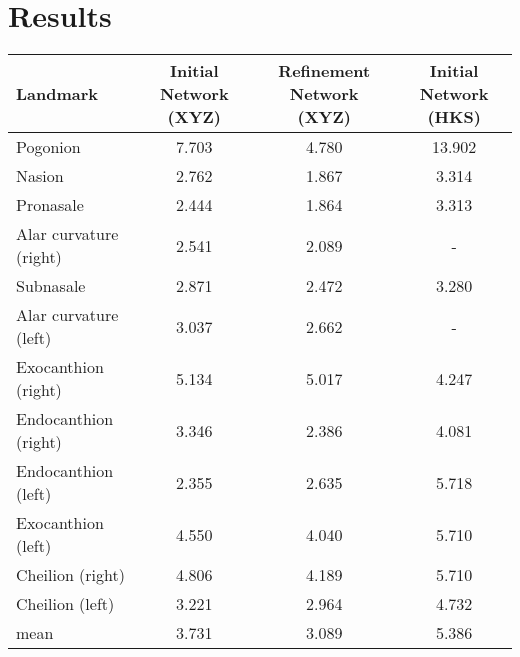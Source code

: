 \documentclass[class=article, crop=false]{standalone}
\begin{document}
\twocolumn



\section{Results}
\label{sec:results}



\begin{table*}[!htbp]

\label{table:landmark_names}
\begin{tabularx}{\textwidth}{l|c|c|c}
\toprule
Landmark               & Initial Network (XYZ)   & Refinement Network (XYZ)   & Initial Network (HKS)           
\\
\midrule
Pogonion               & 7.703       & 4.780 & 13.902                                                                        \\
Nasion                 & 2.762            & 1.867  & 3.314\\ %
Pronasale              & 2.444            & 1.864 & 3.313\\
Alar curvature (right) & 2.541         & 2.089 & -\\
Subnasale              & 2.871         & 2.472 & 3.280 \\
Alar curvature (left)  & 3.037         & 2.662 & - \\
Exocanthion (right)    & 5.134         & 5.017 & 4.247\\
Endocanthion (right)   & 3.346         & 2.386 & 4.081\\
Endocanthion (left)    & 2.355         & 2.635 & 5.718\\
Exocanthion (left)     & 4.550         & 4.040 & 5.710\\
Cheilion (right)       & 4.806         & 4.189 & 5.710\\
Cheilion (left)        & 3.221         & 2.964 & 4.732\\
\bottomrule
mean & 3.731 & 3.089 & 5.386
\end{tabularx}
\end{table*}
\end{document}
